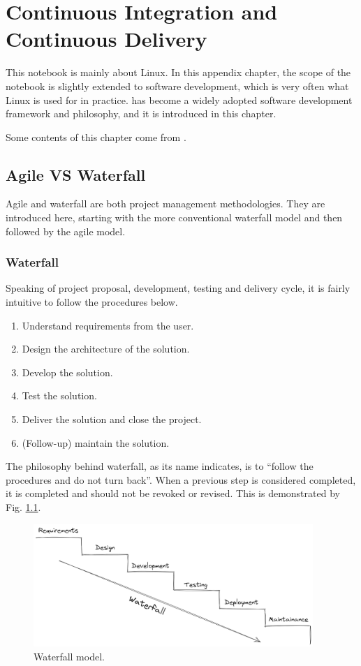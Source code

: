 \chapter{Continuous Integration and Continuous Delivery} \label{ch:cicd}

This notebook is mainly about Linux. In this appendix chapter, the scope of the notebook is slightly extended to software development, which is very often what Linux is used for in practice.  has become a widely adopted software development framework and philosophy, and it is introduced in this chapter.

Some contents of this chapter come from \cite{honai2023cicd}.

\section{Agile VS Waterfall}

Agile and waterfall are both project management methodologies. They are introduced here, starting with the more conventional waterfall model and then followed by the agile model.

\subsection{Waterfall}

Speaking of project proposal, development, testing and delivery cycle, it is fairly intuitive to follow the procedures below.
\begin{enumerate}
	\item Understand requirements from the user.
	\item Design the architecture of the solution.
	\item Develop the solution.
	\item Test the solution.
	\item Deliver the solution and close the project.
	\item (Follow-up) maintain the solution.
\end{enumerate}
The philosophy behind waterfall, as its name indicates, is to ``follow the procedures and do not turn back''. When a previous step is considered completed, it is completed and should not be revoked or revised. This is demonstrated by Fig. \ref{ch:cicd:fig:waterfall}.
\begin{figure}[htbp]
	\centering
	\includegraphics[width=300pt]{chapters/ap/figures/waterfall.png}
	\caption{Waterfall model.} \label{ch:cicd:fig:waterfall}
\end{figure}

